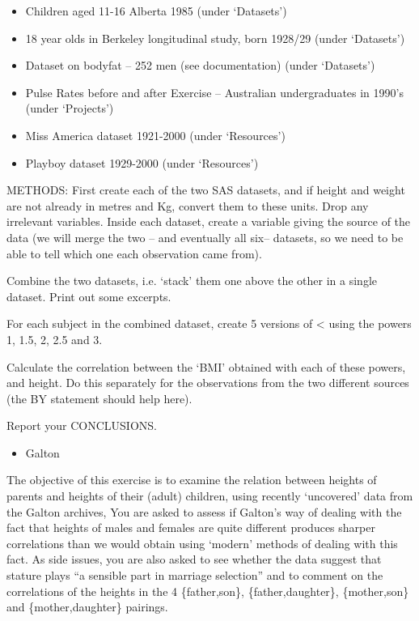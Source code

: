 \documentclass[]{book}
\providecommand{\tightlist}{%
  \setlength{\itemsep}{0pt}\setlength{\parskip}{0pt}}
\begin{document}
\begin{itemize}
\tightlist
\item
  Children aged 11-16 Alberta 1985 (under `Datasets')
\item
  18 year olds in Berkeley longitudinal study, born 1928/29 (under `Datasets')
\item
  Dataset on bodyfat -- 252 men (see documentation) (under `Datasets')
\item
  Pulse Rates before and after Exercise -- Australian undergraduates in 1990's (under `Projects')
\item
  Miss America dataset 1921-2000 (under `Resources')
\item
  Playboy dataset 1929-2000 (under `Resources')
\end{itemize}

METHODS: First create each of the two SAS datasets, and if height and weight are not already in metres and Kg, convert them to these units. Drop any irrelevant variables. Inside each dataset, create a variable giving the source of the data (we will merge the two -- and eventually all six-- datasets, so we need to be able to tell which one each observation came from).

Combine the two datasets, i.e. `stack' them one above the other in a single dataset. Print out some excerpts.

For each subject in the combined dataset, create 5 versions of \textless{} using the powers 1, 1.5, 2, 2.5 and 3.

Calculate the correlation between the `BMI' obtained with each of these powers, and height. Do this separately for the observations from the two different sources (the BY statement should help here).

Report your CONCLUSIONS.

\begin{itemize}
\tightlist
\item
  Galton
\end{itemize}

The objective of this exercise is to examine the relation between heights of parents and heights of their (adult) children, using recently `uncovered' data from the Galton archives, You are asked to assess if Galton's way of dealing with the fact that heights of males and females are quite different produces sharper correlations than we would obtain using `modern' methods of dealing with this fact. As side issues, you are also asked to see whether the data suggest that stature plays ``a sensible part in marriage selection'' and to comment on the correlations of the heights in the 4 \{father,son\}, \{father,daughter\}, \{mother,son\} and \{mother,daughter\} pairings.
\end{document}
